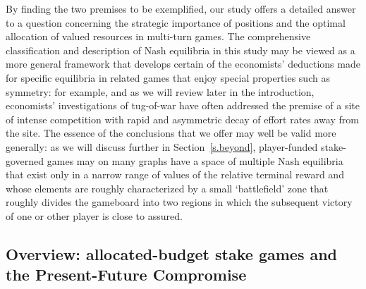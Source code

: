\documentclass[letterpaper,11pt,oneside,reqno]{amsbook}
\numberwithin{figure}{chapter}
\theoremstyle{definition}
\theoremstyle{definition}
\theoremstyle{definition}
\theoremstyle{definition}
\theoremstyle{definition}
\begin{document}
 By finding the two premises to be exemplified, our study offers a detailed answer to a question concerning the strategic importance of positions and the optimal allocation of valued resources in multi-turn games. The comprehensive classification and description of Nash equilibria in this study may be viewed as a more general framework that develops certain of the economists' deductions made for specific equilibria in related games that enjoy special properties such as symmetry: for example, and as we will review later in the introduction, economists' investigations of tug-of-war have often addressed the premise of a site of intense competition with rapid and asymmetric decay of effort rates away from the site. 
 The essence of the conclusions that we offer may well be valid more generally:
  as we will discuss further in Section~\ref{s.beyond},  player-funded stake-governed games  may on many graphs
have a space of multiple Nash equilibria that exist only in a narrow range of values of the relative terminal reward and  whose elements are roughly characterized by a small `battlefield' zone that roughly divides the gameboard into two regions in which the subsequent victory of one or other player is close to assured. 
 
 


 
\subsection{Overview: allocated-budget stake games and the Present-Future Compromise}\label{s.overviewallocated}
\end{document}
